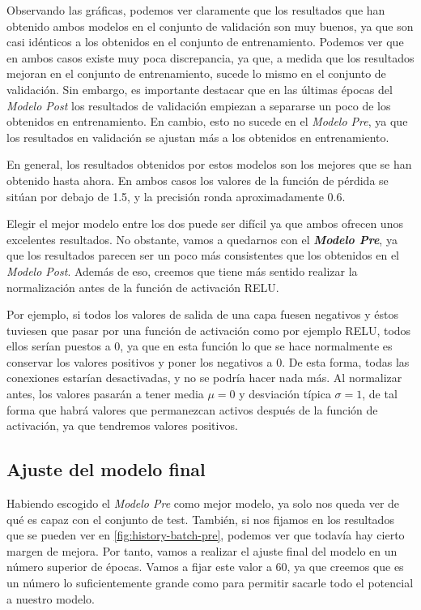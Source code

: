 \documentclass[11pt,a4paper]{article}
\begin{document}
Observando las gráficas, podemos ver claramente que los resultados que han obtenido ambos
modelos en el conjunto de validación son muy buenos, ya que son casi idénticos a los obtenidos
en el conjunto de entrenamiento. Podemos ver que en ambos casos existe muy poca discrepancia,
ya que, a medida que los resultados mejoran en el conjunto de entrenamiento, sucede lo mismo
en el conjunto de validación. Sin embargo, es importante destacar que en las últimas épocas
del \textit{Modelo Post} los resultados de validación empiezan a separarse un poco de los
obtenidos en entrenamiento. En cambio, esto no sucede en el \textit{Modelo Pre}, ya que los
resultados en validación se ajustan más a los obtenidos en entrenamiento.

En general, los resultados obtenidos por estos modelos son los mejores que se han obtenido
hasta ahora. En ambos casos los valores de la función de pérdida se sitúan por debajo de 1.5,
y la precisión ronda aproximadamente 0.6.

Elegir el mejor modelo entre los dos puede ser difícil ya que ambos ofrecen unos excelentes
resultados. No obstante, vamos a quedarnos con el \textbf{\textit{Modelo Pre}}, ya que los resultados
parecen ser un poco más consistentes que los obtenidos en el \textit{Modelo Post}. Además de eso,
creemos que tiene más sentido realizar la normalización antes de la función de activación RELU.

Por ejemplo, si todos los valores de salida de una capa fuesen negativos y éstos tuviesen que pasar
por una función de activación como por ejemplo RELU, todos ellos serían puestos a 0, ya que en esta
función lo que se hace normalmente es conservar los valores positivos y poner los negativos a 0.
De esta forma, todas las conexiones estarían desactivadas, y no se podría hacer nada más. Al normalizar
antes, los valores pasarán a tener media $\mu = 0$ y desviación típica $\sigma = 1$, de tal forma
que habrá valores que permanezcan activos después de la función de activación, ya que tendremos
valores positivos.


\subsection{Ajuste del modelo final}

Habiendo escogido el \textit{Modelo Pre} como mejor modelo, ya solo nos queda ver de qué es capaz
con el conjunto de test. También, si nos fijamos en los resultados que se pueden ver en
\ref{fig:history-batch-pre}, podemos ver que todavía hay cierto margen de mejora. Por tanto,
vamos a realizar el ajuste final del modelo en un número superior de épocas. Vamos a fijar
este valor a 60, ya que creemos que es un número lo suficientemente grande como para permitir
sacarle todo el potencial a nuestro modelo.
\end{document}
